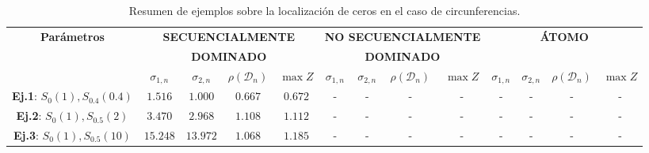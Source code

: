 \begin{table}
  \centering
  \footnotesize
  \caption{Resumen de ejemplos sobre la localización de ceros en el caso de circunferencias.}
  \begin{tabular}{|c|cccc|cccc|cccc|}
    \hline
    \multirow{3}{*}{\textbf{Parámetros}}     & \multicolumn{4}{c|}{\textbf{SECUENCIALMENTE}} & \multicolumn{4}{c|}{\textbf{NO SECUENCIALMENTE}} & \multicolumn{4}{c|}{\textbf{ÁTOMO}}                                                                                                                                                                            \\
                                             & \multicolumn{4}{c|}{\textbf{DOMINADO}}        & \multicolumn{4}{c|}{\textbf{DOMINADO}}           & \multicolumn{4}{c|}{}                                                                                                                                                                                          \\
    \cline{2-13}
                                             & $\sigma_{1,n}$                                & $\sigma_{2,n}$                                   & $\rho(\mathcal{D}_{n})$             & $\max Z$ & $\sigma_{1,n}$         & $\sigma_{2,n}$ & $\rho(\mathcal{D}_{n})$ & $\max Z$ & $\sigma_{1,n}$         & $\sigma_{2,n}$ & $\rho(\mathcal{D}_{n})$ & $\max Z$   \\
    \hline
    \textbf{Ej.1}: $S_{0}(1), S_{0.4}(0.4)$  & $1.516$                                       & $1.000$                                          & $0.667$                             & $0.672$  & -                      & -              & -                       & -        & -                      & -              & -                       & -          \\
    \textbf{Ej.2}: $S_{0}(1), S_{0.5}(2)$    & $3.470$                                       & $2.968$                                          & $1.108$                             & $1.112$  & -                      & -              & -                       & -        & -                      & -              & -                       & -          \\
    \textbf{Ej.3}: $S_{0}(1), S_{0.5}(10)$   & $15.248$                                      & $13.972$                                         & $1.068$                             & $1.185$  & -                      & -              & -                       & -        & -                      & -              & -                       & -          \\

\end{tabular}
\end{table}

